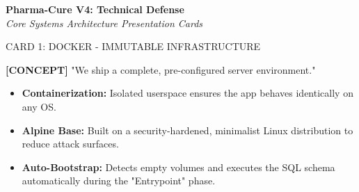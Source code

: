 \documentclass[12pt, a4paper]{article}
\begin{document}
\begin{center}
    \Huge \textbf{Pharma-Cure V4: Technical Defense} \\
    \large \textit{Core Systems Architecture Presentation Cards}
\end{center}

\vspace{0.3cm}

\begin{presentercard}{CARD 1: DOCKER - IMMUTABLE INFRASTRUCTURE}
    \begin{minipage}{0.62\textwidth}
        \textbf{[CONCEPT]} "We ship a complete, pre-configured server environment."
        \begin{itemize}
            \item \textbf{Containerization:} Isolated userspace ensures the app behaves identically on any OS.
            \item \textbf{Alpine Base:} Built on a security-hardened, minimalist Linux distribution to reduce attack surfaces.
            \item \textbf{Auto-Bootstrap:} Detects empty volumes and executes the SQL schema automatically during the "Entrypoint" phase.
        \end{itemize}
    \end{minipage}
    \begin{minipage}{0.35\textwidth}
        \centering
    \end{minipage}
\end{presentercard}

\vspace{0.4cm}
\end{document}
